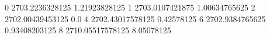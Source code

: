 0 2703.2236328125 1.21923828125
1 2703.0107421875 1.00634765625
2 2702.00439453125 0.0
4 2702.43017578125 0.42578125
6 2702.9384765625 0.93408203125
8 2710.05517578125 8.05078125
